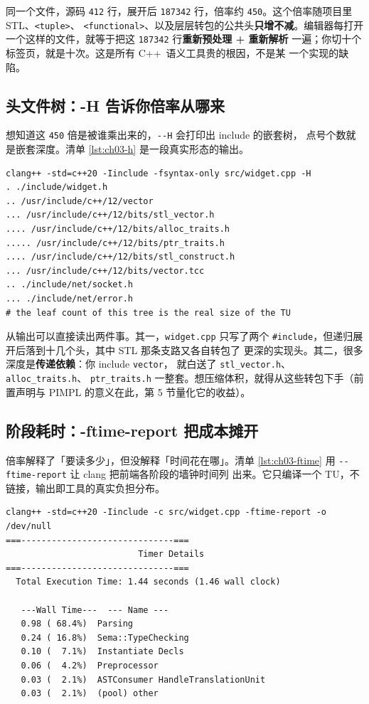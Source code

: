 \documentclass[12pt,a4paper,fontset=fandol]{ctexbook}
\newcommand{\Opt}[1]{\texttt{-\/-#1}}
\newcommand{\Lang}[1]{\textsf{#1}}
\newcommand{\CPP}{\Lang{C++}}
\begin{document}
同一个文件，源码 \texttt{412} 行，展开后 \texttt{187342} 行，倍率约
\texttt{450}。这个倍率随项目里 STL、\texttt{<tuple>}、
\texttt{<functional>}、以及层层转包的公共头\textbf{只增不减}。编辑器每打开
一个这样的文件，就等于把这 \texttt{187342} 行\textbf{重新预处理 + 重新解析}
一遍；你切十个标签页，就是十次。这是所有 \CPP\ 语义工具贵的根因，不是某
一个实现的缺陷。

\subsection*{头文件树：-H 告诉你倍率从哪来}

想知道这 \texttt{450} 倍是被谁乘出来的，\Opt{H} 会打印出 include 的嵌套树，
点号个数就是嵌套深度。清单 \ref{lst:ch03-h} 是一段真实形态的输出。

\begin{lstlisting}[style=shellstyle,caption={clang -H 打印 include 树，点号是深度},label={lst:ch03-h}]
clang++ -std=c++20 -Iinclude -fsyntax-only src/widget.cpp -H
. ./include/widget.h
.. /usr/include/c++/12/vector
... /usr/include/c++/12/bits/stl_vector.h
.... /usr/include/c++/12/bits/alloc_traits.h
..... /usr/include/c++/12/bits/ptr_traits.h
.... /usr/include/c++/12/bits/stl_construct.h
... /usr/include/c++/12/bits/vector.tcc
.. ./include/net/socket.h
... ./include/net/error.h
# the leaf count of this tree is the real size of the TU
\end{lstlisting}

从输出可以直接读出两件事。其一，\texttt{widget.cpp} 只写了两个
\texttt{\#include}，但递归展开后落到十几个头，其中 STL 那条支路又各自转包了
更深的实现头。其二，很多深度是\textbf{传递依赖}：你 include \texttt{vector}，
就白送了 \texttt{stl\_vector.h}、\texttt{alloc\_traits.h}、
\texttt{ptr\_traits.h} 一整套。想压缩体积，就得从这些转包下手（前置声明与
PIMPL 的意义在此，第 5 节量化它的收益）。

\subsection*{阶段耗时：-ftime-report 把成本摊开}

倍率解释了「要读多少」，但没解释「时间花在哪」。清单
\ref{lst:ch03-ftime} 用 \Opt{ftime-report} 让 clang 把前端各阶段的墙钟时间列
出来。它只编译一个 TU，不链接，输出即工具的真实负担分布。

\begin{lstlisting}[style=shellstyle,caption={-ftime-report 拆解单个 TU 的各阶段耗时},label={lst:ch03-ftime}]
clang++ -std=c++20 -Iinclude -c src/widget.cpp -ftime-report -o /dev/null
===------------------------------===
                          Timer Details
===------------------------------===
  Total Execution Time: 1.44 seconds (1.46 wall clock)

   ---Wall Time---  --- Name ---
   0.98 ( 68.4%)  Parsing
   0.24 ( 16.8%)  Sema::TypeChecking
   0.10 (  7.1%)  Instantiate Decls
   0.06 (  4.2%)  Preprocessor
   0.03 (  2.1%)  ASTConsumer HandleTranslationUnit
   0.03 (  2.1%)  (pool) other
\end{lstlisting}
\end{document}
